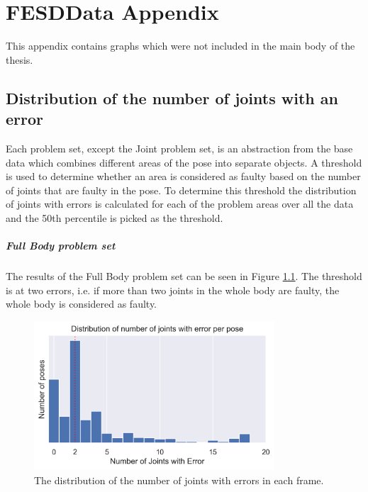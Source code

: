 \chapter{FESDData Appendix}

This appendix contains graphs which were not included in the main body of the thesis.

\section{Distribution of the number of joints with an error}

Each problem set, except the Joint problem set, is an abstraction from the base data which combines different areas of the pose into separate objects. A threshold is used to determine whether an area is considered as faulty based on the number of joints that are faulty in the pose. To determine this threshold the distribution of joints with errors is calculated for each of the problem areas over all the data and the 50th percentile is picked as the threshold.

\paragraph{Full Body problem set}

The results of the Full Body problem set can be seen in Figure \ref{fig:dist_jt_epp}. The threshold is at two errors, i.e. if more than two joints in the whole body are faulty, the whole body is considered as faulty.

\begin{figure}[ht]
  \centering
  \includegraphics[width=0.8\textwidth]{figures/Data/joint_errors_per_pose/distribution_of_joint_errors_per_pose.png}
  \caption[Number of Joints with error]{The distribution of the number of joints with errors in each frame.}
  \label{fig:dist_jt_epp}
\end{figure}


